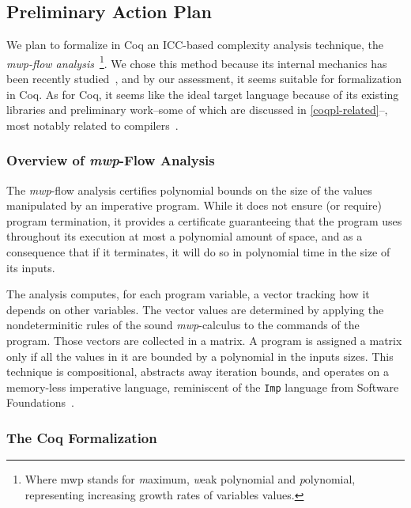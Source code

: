 \subsection{Preliminary Action Plan}\label{coqpl-preliminary-action-plan}

We plan to formalize in Coq an ICC-based complexity analysis technique, the \emph{mwp-flow analysis}~\cite{jones2009}\footnote{%
  Where mwp stands for \emph{m}aximum, \emph{w}eak polynomial and \emph{p}olynomial, representing increasing growth rates of variables values.}.
We chose this method because its internal mechanics has been recently studied~\cite{aubert20222}, and by our assessment, it seems suitable for formalization in Coq.
As for Coq, it seems like the ideal target language because of its existing libraries and preliminary work--some of which are discussed in \autoref{coqpl-related}--, most notably related to compilers~\cite{leroy2009}.

\subsubsection{Overview of \emph{mwp}-Flow Analysis}\label{coqpl-overview-of-mwp-flow-analysis}

The \emph{mwp}-flow analysis certifies polynomial bounds on the size of the values manipulated by an imperative program.
While it does not ensure (or require) program termination, it provides a certificate guaranteeing that the program uses throughout its execution at most a polynomial amount of space, and as a consequence that if it terminates, it will do so in polynomial time in the size of its inputs.

The analysis computes, for each program variable, a vector tracking how it depends on other variables.
The vector values are determined by applying the nondeterminitic rules of the sound \emph{mwp}-calculus to the commands of the program.
Those vectors are collected in a matrix.
A program is assigned a matrix only if all the values in it are bounded by a polynomial in the inputs sizes.
This technique is compositional, abstracts away \eg iteration bounds, and operates on a memory-less imperative language, reminiscent of the \texttt{Imp} language from Software Foundations~\cite{cpierce20221}.

\subsubsection{The Coq Formalization}\label{coqpl-the-coq-formalization}

